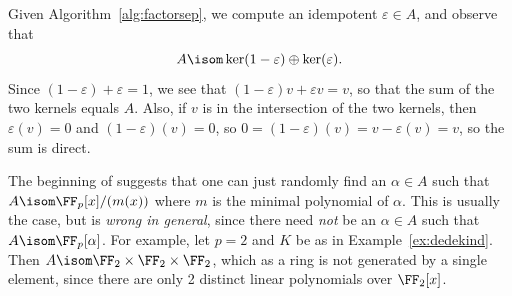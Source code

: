 Given Algorithm~\ref{alg:factorsep}, we compute an idempotent
$\varepsilon \in A$, and observe that
$$
  A \isom \ker(1 - \varepsilon)  \oplus \ker(\varepsilon).
$$
Since $(1 - \varepsilon) + \varepsilon = 1$, we see that
$(1 - \varepsilon)v + \varepsilon v = v$, so that the sum
of the two kernels equals $A$.
Also, if $v$ is in the intersection of the two kernels,
then $\varepsilon(v) = 0$ and $(1-\varepsilon)(v) =0$, so
$0 = (1-\varepsilon)(v) = v - \varepsilon(v) = v$, so the sum is direct.

\begin{remark}
  The beginning of \cite[\S6.2.4]{cohen:course_ant} suggests that one
  can just randomly find an $\alpha \in A$ such that $A\isom
  \FF_p[x]/(m(x))$ where $m$ is the minimal polynomial of $\alpha$.
  This is usually the case, but is {\em wrong in general}, since there
  need {\em not} be an $\alpha \in A$ such that $A \isom
  \FF_p[\alpha]$.  For example, let $p=2$ and $K$ be as in
  Example~\ref{ex:dedekind}.  Then $A \isom \FF_2 \times \FF_2 \times
  \FF_2$, which as a ring is not generated by a single element, since
  there are only 2 distinct linear polynomials over $\FF_2[x]$.
\end{remark}

